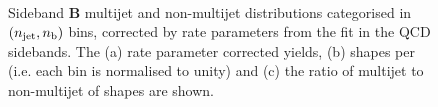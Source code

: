 \begin{figure}[!h]
  \centering
   \\
  \caption{Sideband \textbf{B} multijet and non-multijet distributions
    categorised in $(n_{\text{jet}}, n_{\text{b}})$ bins, corrected by rate parameters
    from the fit in the QCD sidebands. The (a) rate parameter corrected yields,
    (b) \nb shapes per \njet (i.e. each \njet bin is normalised to unity) and
    (c) the ratio of multijet to non-multijet of \nb shapes are shown.}
  \label{fig:qcd_nb_shapes_mhtmetsb}
\end{figure}

